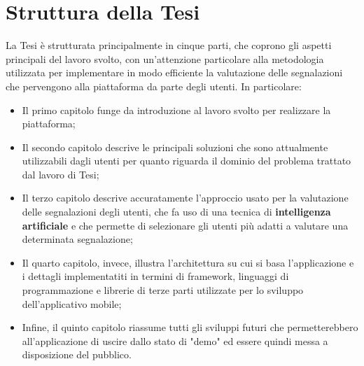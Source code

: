         \newpage

\section{Struttura della Tesi}
        La Tesi è strutturata principalmente in cinque parti, che coprono gli aspetti principali del lavoro svolto, con un'attenzione particolare alla metodologia utilizzata per implementare in modo efficiente la valutazione delle segnalazioni che pervengono alla piattaforma da parte degli utenti. In particolare:
        \begin{itemize}
            \item Il primo capitolo funge da introduzione al lavoro svolto per realizzare la piattaforma;
            \item Il secondo capitolo descrive le principali soluzioni che sono attualmente utilizzabili dagli utenti per quanto riguarda il dominio del problema trattato dal lavoro di Tesi;
            \item Il terzo capitolo descrive accuratamente l'approccio usato per la valutazione delle segnalazioni degli utenti, che fa uso di una tecnica di \textbf{intelligenza artificiale} e che permette di selezionare gli utenti più adatti a valutare una determinata segnalazione;
            \item Il quarto capitolo, invece, illustra l'architettura su cui si basa l'applicazione e i dettagli implementatiti in termini di framework, linguaggi di programmazione e librerie di terze parti utilizzate per lo sviluppo dell'applicativo mobile;
            \item Infine, il quinto capitolo riassume tutti gli sviluppi futuri che permetterebbero all'applicazione di uscire dallo stato di "demo" ed essere quindi messa a disposizione del pubblico.
        \end{itemize}
